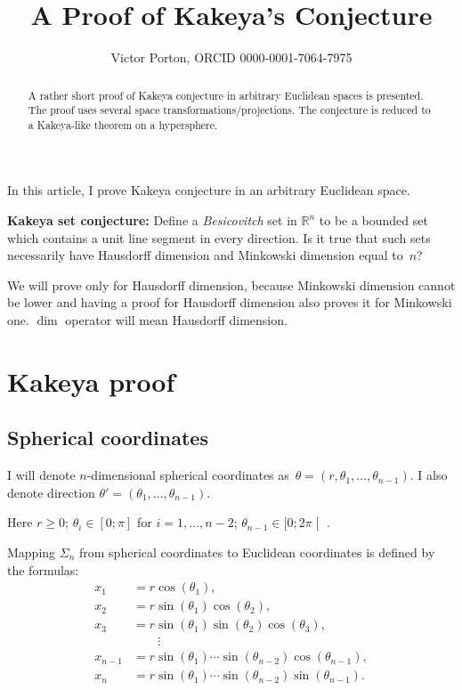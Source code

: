 \documentclass[oneside,draft]{amsart}
\title{A Proof of Kakeya's Conjecture}
\author{Victor Porton, ORCID 0000-0001-7064-7975}
\begin{document}
\begin{abstract}
A rather short proof of Kakeya conjecture in arbitrary Euclidean spaces is presented. The proof uses several space transformations/projections. The conjecture is reduced to a Ka\-ke\-ya-li\-ke theorem on a hypersphere.
\end{abstract}

\maketitle  

In this article, I prove Kakeya conjecture in an arbitrary Euclidean space.

\textbf{Kakeya set conjecture:} \cite{kakeya-long,tao-blog-kakeya} Define a \emph{Besicovitch} set in $\mathbb{R}^n$ to be a bounded set which contains a unit line segment in every direction. Is it true that such sets necessarily have Hausdorff dimension and Minkowski dimension equal to~$n$?

We will prove only for Hausdorff dimension, because Minkowski dimension cannot be lower and having a proof for Hausdorff dimension also proves it for Minkowski one. $\dim$ operator will mean Hausdorff dimension.

\section{Kakeya proof}

\subsection{Spherical coordinates}

I will denote $n$-dimensional spherical coordinates as~$\theta=(r, \theta_1,\dots,\theta_{n-1})$.
I also denote direction $\theta'=(\theta_1,\dots,\theta_{n-1})$.

Here $r\geq 0$; $\theta_i\in[0;\pi]$ for $i=1,\dots,n-2$; $\theta_{n-1}\in[0;2\pi\mathclose[$ .

Mapping $\Sigma_n$ from spherical coordinates to Euclidean coordinates is defined by the formulas:
\[
\begin{aligned}x_{1}&=r\cos(\theta _{1}),\\x_{2}&=r\sin(\theta _{1})\cos(\theta _{2}),\\x_{3}&=r\sin(\theta _{1})\sin(\theta _{2})\cos(\theta _{3}),\\&\qquad \vdots \\x_{n-1}&=r\sin(\theta _{1})\cdots \sin(\theta _{n-2})\cos(\theta _{n-1}),\\x_{n}&=r\sin(\theta _{1})\cdots \sin(\theta _{n-2})\sin(\theta _{n-1}).\end{aligned}
\]
\end{document}
